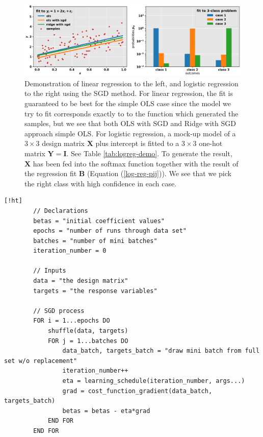 \documentclass[]{article}
\begin{document}
\begin{figure}[!htb]
	\centering
	\includegraphics[width=1\linewidth]{demo_lin_log_reg.png}
	\caption{Demonstration of linear regression to the left, and logistic regression to the right using the SGD method. For linear regression, the fit is guaranteed to be best for the simple OLS case since the model we try to fit corresponds exactly to to the function which generated the samples, but we see that both OLS with SGD and Ridge with SGD approach simple OLS. For logistic regression, a mock-up model of a $3 \times 3$ design matrix $\mathbf{X}$ plus intercept is fitted to a $3 \times 3$ one-hot matrix $\mathbf{Y} = \mathbf{I}$. See Table \ref{tab:logreg-demo}. To generate the result, $\mathbf{X}$ has been fed into the softmax function together with the result of the regression fit $\mathbf{B}$ (Equation (\ref{log-reg-pij})). We see that we pick the right class with high confidence in each case.}
	\label{fig:demo_lin_log_reg}
\end{figure}

\begin{minipage}{\linewidth}
	\begin{lstlisting}[caption={Stochastic Gradient Descent algorithm. Cost function gradients and learning schedules may be defined independently of the implementation of SGD. This implementation runs for \lstinline|epochs*batches| iterations, and does not sense if or when it converges.},label={lst:sgd}] [!ht]
		// Declarations
		betas = "initial coefficient values"
		epochs = "number of runs through data set"
		batches = "number of mini batches"
		iteration_number = 0
		
		// Inputs
		data = "the design matrix"
		targets = "the response variables"
	
		// SGD process	
		FOR i = 1...epochs DO
			shuffle(data, targets)
			FOR j = 1...batches DO
				data_batch, targets_batch = "draw mini batch from full set w/o replacement"
				iteration_number++
				eta = learning_schedule(iteration_number, args...)
				grad = cost_function_gradient(data_batch, targets_batch)
				betas = betas - eta*grad
			END FOR
		END FOR
	\end{lstlisting}
\end{minipage}
\end{document}
